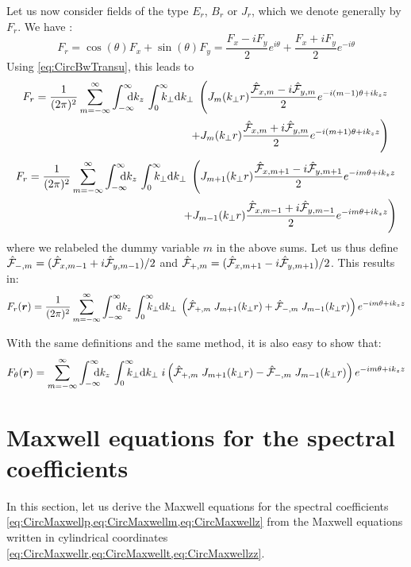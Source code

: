 Let us now consider fields of the type $E_r$, $B_r$ or $J_r$, which we
denote generally by $F_r$. We have :
\[ F_r = \cos(\theta) F_x + \sin(\theta) F_y 
= \frac{F_x - iF_y}{2}e^{i\theta} + \frac{F_x +
  iF_y}{2}e^{-i\theta} \] 
Using \cref{eq:CircBwTransu}, this leads to
\begin{align*} 
F_r =   \frac{1}{(2\pi)^2}\sum_{m=-\infty}^{\infty} \Integ{k_z}\,\RInteg{k_\perp }\;
\left(  J_m(k_\perp r) \frac{\spectral{F}_{x,m} -
    i\spectral{F}_{y,m}}{2}e^{-i(m-1)\theta +ik_z z} \right. \\
\left. + J_m(k_\perp r) \frac{\spectral{F}_{x,m} +   i\spectral{F}_{y,m}}{2}e^{-i(m+1)\theta +
    ik_z z} \right) 
\end{align*}
\begin{align*}
F_r =  \frac{1}{(2\pi)^2}\sum_{m=-\infty}^{\infty} \Integ{k_z}\,\RInteg{k_\perp }\;
\left(  J_{m+1}(k_\perp r) \frac{\spectral{F}_{x,m+1} -
    i\spectral{F}_{y,m+1}}{2}e^{-im\theta +ik_z z} \right. \\
\left. + J_{m-1}(k_\perp r) \frac{\spectral{F}_{x,m-1} +   i\spectral{F}_{y,m-1}}{2}e^{-im\theta +
    ik_z z} \right) 
\end{align*}
where we relabeled the dummy variable $m$ in the above sums. Let us
thus define $\hat{\mathcal{F}}_{-,m} = (\hat{\mathcal{F}}_{x,m-1} +
    i\hat{\mathcal{F}}_{y,m-1})/2$ and $\hat{\mathcal{F}}_{+,m} = (\hat{\mathcal{F}}_{x,m+1} -
    i\hat{\mathcal{F}}_{y,m+1})/2$. This results in:
\begin{equation} 
F_r(\vec{r}) =  \frac{1}{(2\pi)^2}\sum_{m=-\infty}^{\infty} \Integ{k_z}\,\RInteg{k_\perp }\;
\left( \spectral{F}_{+,m}\; J_{m+1}(k_\perp r) +\spectral{F}_{-,m}\; J_{m-1}(k_\perp r)
\right)  e^{-im\theta +ik_z z}
\end{equation}

With the same definitions and the same method, it is also easy to show that:
\begin{equation} 
F_\theta(\vec{r}) = \sum_{m=-\infty}^{\infty} \Integ{k_z}\,\RInteg{k_\perp }\;
i\left( \spectral{F}_{+,m}\; J_{m+1}(k_\perp r) - \spectral{F}_{-,m}\; J_{m-1}(k_\perp r)
\right)  e^{-im\theta +ik_z z}
\end{equation}

\section{Maxwell equations for the spectral coefficients}
\label{sec:SpectMaxwell}

In this section, let us derive the Maxwell equations for the spectral
coefficients \cref{eq:CircMaxwellp,eq:CircMaxwellm,eq:CircMaxwellz}
from the Maxwell equations written in cylindrical coordinates \cref{eq:CircMaxwellr,eq:CircMaxwellt,eq:CircMaxwellzz}.

